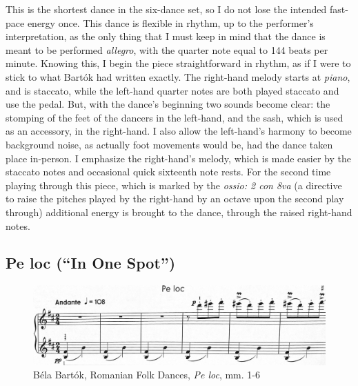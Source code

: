 This is the shortest dance in the six-dance set, so I do not lose the intended fast-pace energy once. This dance is flexible in rhythm, up to the performer's interpretation, as the only thing that I must keep in mind that the dance is meant to be performed \textit{allegro}, with the quarter note equal to 144 beats per minute. Knowing this, I begin the piece straightforward in rhythm, as if I were to stick to what Bartók had written exactly. The right-hand melody starts at \textit{piano}, and is staccato, while the left-hand quarter notes are both played staccato and use the pedal. But, with the dance's beginning two sounds become clear: the stomping of the feet of the dancers in the left-hand, and the sash, which is used as an accessory, in the right-hand. I also allow the left-hand's harmony to become background noise, as actually foot movements would be, had the dance taken place in-person. I emphasize the right-hand's melody, which is made easier by the staccato notes and occasional quick sixteenth note rests. For the second time playing through this piece, which is marked by the \textit{ossio: 2 con 8va} (a directive to raise the pitches played by the right-hand by an octave upon the second play through) additional energy is brought to the dance, through the raised right-hand notes. 


\subsection{Pe loc (``In One Spot'')}

\begin{figure}
  \centering
  \includegraphics[width=\textwidth]{figures/bartok-one-spot-beginning.jpg}
  \caption{Béla Bartók, Romanian Folk Dances, \textit{Pe loc}, mm. 1-6}
  \label{fig:Bartók-one-spot-beginning}
\end{figure}

